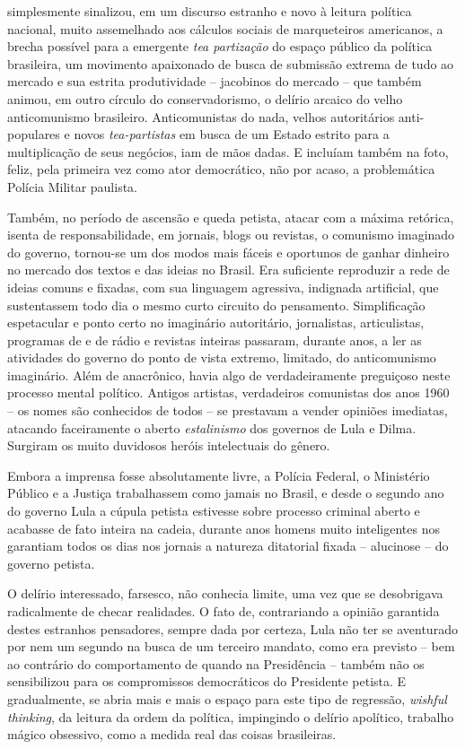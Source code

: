  simplesmente sinalizou, em um discurso estranho e novo à leitura política
nacional, muito assemelhado aos cálculos sociais de marqueteiros americanos, a
brecha possível para a emergente \textit{tea partização} do espaço público da política
brasileira, um movimento apaixonado de busca de submissão extrema de tudo ao
mercado e sua estrita produtividade -- jacobinos do mercado -- que também animou,
em outro círculo do conservadorismo, o delírio arcaico do velho anticomunismo
brasileiro. Anticomunistas do nada, velhos autoritários anti-populares e novos
\textit{tea-partistas} em busca de um Estado estrito para a multiplicação de seus
negócios, iam de mãos dadas. E incluíam também na foto, feliz, pela primeira
vez como ator democrático, não por acaso, a problemática Polícia Militar
paulista. 

Também, no período de ascensão e queda petista, atacar com a máxima
retórica, isenta de responsabilidade, em jornais, blogs ou revistas, o
comunismo imaginado do governo, tornou-se um dos modos mais fáceis e
oportunos de ganhar dinheiro no mercado dos textos e das ideias no
Brasil. Era suficiente reproduzir a rede de ideias comuns e fixadas, com
sua linguagem agressiva, indignada artificial, que sustentassem todo dia
o mesmo curto circuito do pensamento. Simplificação espetacular e ponto
certo no imaginário autoritário, jornalistas, articulistas, programas de
 e de rádio e revistas inteiras passaram, durante anos, a ler as
atividades do governo do ponto de vista extremo, limitado, do
anticomunismo imaginário. Além de anacrônico, havia algo de
verdadeiramente preguiçoso neste processo mental político. Antigos
artistas, verdadeiros comunistas dos anos 1960 -- os nomes são
conhecidos de todos -- se prestavam a vender opiniões imediatas,
atacando faceiramente o aberto \emph{estalinismo} dos governos de Lula e
Dilma. Surgiram os muito duvidosos heróis intelectuais do gênero.

Embora a imprensa fosse absolutamente livre, a Polícia Federal, o
Ministério Público e a Justiça trabalhassem como jamais no Brasil, e
desde o segundo ano do governo Lula a cúpula petista estivesse sobre
processo criminal aberto e acabasse de fato inteira na cadeia, durante
anos homens muito inteligentes nos garantiam todos os dias nos jornais a
natureza ditatorial fixada -- alucinose -- do governo petista.

O delírio interessado, farsesco, não conhecia limite, uma vez que se
desobrigava radicalmente de checar realidades. O fato de, contrariando a
opinião garantida destes estranhos pensadores, sempre dada por certeza,
Lula não ter se aventurado por nem um segundo na busca de um terceiro
mandato, como era previsto -- bem ao contrário do comportamento de 
quando na Presidência -- também não os sensibilizou para os compromissos
democráticos do Presidente petista. E gradualmente, se abria mais e mais
o espaço para este tipo de regressão, \emph{wishful thinking}, da
leitura da ordem da política, impingindo o delírio apolítico, trabalho
mágico obsessivo, como a medida real das coisas brasileiras.

